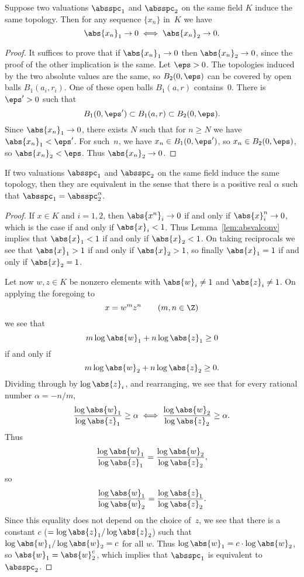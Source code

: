\documentclass[11pt]{book}
\begin{document}
\begin{ch}
\begin{lemma}\label{lem:absvalconv}
Suppose two valuations $\absspc_1$ and $\absspc_2$ on the same
field $K$ induce the same topology. Then
for any sequence $\{x_n\}$ in~$K$ we
have
$$
  \abs{x_n}_1 \to 0 \iff \abs{x_n}_2 \to 0.
$$
\end{lemma}
\begin{proof}
It suffices to prove that if $\abs{x_n}_1\to 0$
then $\abs{x_n}_2\to 0$, since the proof of the
other implication is the same.
Let $\eps>0$.  The topologies induced by the two absolute
values are the same, so $B_2(0,\eps)$ can be covered by
open balls $B_1(a_i,r_i)$.  One of these open balls
$B_1(a,r)$ contains~$0$. There is $\eps'>0$ such that
$$
  B_1(0,\eps') \subset B_1(a,r)\subset B_2(0,\eps).
$$
Since $\abs{x_n}_1\to 0$, there exists $N$ such
that for $n\geq N$ we have $\abs{x_n}_1 <\eps'$.
For such~$n$, we have $x_n\in B_1(0,\eps')$, so $x_n\in B_2(0,\eps)$,
so $\abs{x_n}_2<\eps$.  Thus $\abs{x_n}_2\to 0$.
\end{proof}

\begin{proposition}\label{prop:same_topo}
If two valuations $\absspc_1$ and $\absspc_2$ on the same
field induce the same topology, then they are equivalent in
the sense that there is a positive real $\alpha$ such that
$\absspc_1 = \absspc_2^{\alpha}$.
\end{proposition}
\begin{proof}
If $x\in K$ and $i=1,2$, then $\abs{x^n}_i \to 0$
if and only if $\abs{x}_i^n\to 0$, which is the
case if and only if $\abs{x}_i<1$.   Thus
Lemma~\ref{lem:absvalconv} implies that
$\abs{x}_1<1$ if and only if $\abs{x}_2<1$.
On taking reciprocals we see that $\abs{x}_1>1$
if and only if $\abs{x}_2>1$, so finally
$\abs{x}_1 = 1$ if and only if $\abs{x}_2=1$.

Let now $w,z\in K$ be nonzero elements with $\abs{w}_i \neq 1$ and
$\abs{z}_i\neq 1$.  On
applying the foregoing to
$$
  x = w^m z^n \qquad (m,n\in\Z)
$$
we see that
$$
  m\log\abs{w}_1 + n\log\abs{z}_1 \geq 0
$$
if and only if
$$
  m\log\abs{w}_2 + n\log\abs{z}_2 \geq 0.
$$
Dividing through by $\log\abs{z}_i$, and rearranging,
we see that for every rational number $\alpha=-n/m$,
$$
  \frac{\log\abs{w}_1}{\log \abs{z}_1} \geq \alpha
\iff
  \frac{\log\abs{w}_2}{\log \abs{z}_2} \geq \alpha.
$$
Thus
$$
  \frac{\log\abs{w}_1}{\log \abs{z}_1} =
                \frac{\log\abs{w}_2}{\log \abs{z}_2},
$$
so
$$
  \frac{\log\abs{w}_1}{\log \abs{w}_2} =
                \frac{\log\abs{z}_1}{\log \abs{z}_2}.
$$
Since this equality does not depend on the choice of~$z$,
we see that there is a constant $c$ ($=\log\abs{z}_1/\log \abs{z}_2$)
such that $\log\abs{w}_1/\log \abs{w}_2 = c$ for all $w$.
Thus $\log\abs{w}_1 = c\cdot \log\abs{w}_2$, so
$\abs{w}_1 = \abs{w}_2^c$, which implies that $\absspc_1$
is equivalent to $\absspc_2$.
\end{proof}


\end{ch}
\end{document}
